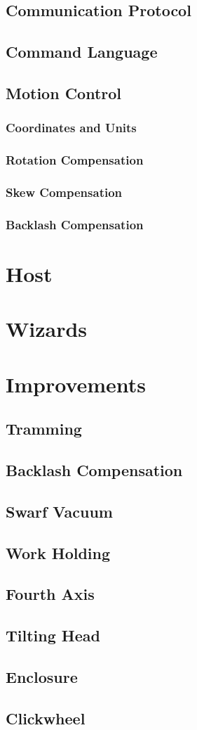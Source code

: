 \documentclass[a4paper,11pt]{article}
\begin{document}
\subsection{Communication Protocol}
\subsection{Command Language}
\subsection{Motion Control}
\subsubsection{Coordinates and Units}
\subsubsection{Rotation Compensation}
\subsubsection{Skew Compensation}
\subsubsection{Backlash Compensation}

\section{Host}
\section{Wizards}

\section{Improvements}
\subsection{Tramming}
\subsection{Backlash Compensation}
\subsection{Swarf Vacuum}
\subsection{Work Holding}
\subsection{Fourth Axis}
\subsection{Tilting Head}
\subsection{Enclosure}
\subsection{Clickwheel}
\end{document}
